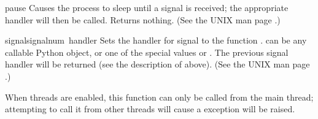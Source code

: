 \begin{funcdesc}{pause}{}
  Causes the process to sleep until a signal is received; the
  appropriate handler will then be called.  Returns nothing.  (See the
  UNIX man page .)
\end{funcdesc}

\begin{funcdesc}{signal}{signalnum\, handler}
  Sets the handler for signal  to the function
  .   can be any callable Python object, or
  one of the special values  or
  .  The previous signal handler will be returned
  (see the description of  above).  (See the UNIX
  man page .)

  When threads are enabled, this function can only be called from the
  main thread; attempting to call it from other threads will cause a
   exception will be raised.
\end{funcdesc}
